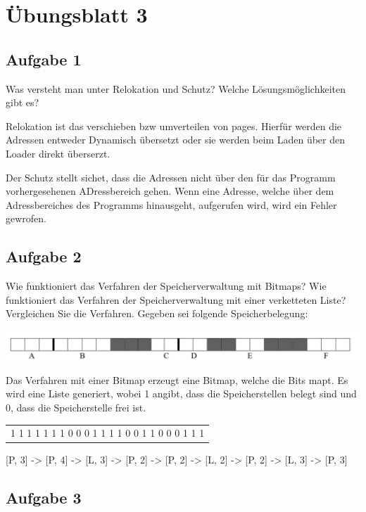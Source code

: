 \chapter{Übungsblatt 3}

\section{Aufgabe 1}

Was versteht man unter Relokation und Schutz? Welche Lösungsmöglichkeiten gibt es?

Relokation ist das verschieben bzw umverteilen von pages. Hierfür werden die Adressen entweder Dynamisch übersetzt oder sie werden beim Laden über den Loader direkt überserzt. 

Der Schutz stellt sichet, dass die Adressen nicht über den für das Programm vorhergesehenen ADressbereich gehen. Wenn eine Adresse, welche über dem Adressbereiches des Programms hinausgeht, aufgerufen wird, wird ein Fehler gewrofen.

\section{Aufgabe 2}

Wie funktioniert das Verfahren der Speicherverwaltung mit Bitmaps? Wie funktioniert das Verfahren der Speicherverwaltung mit einer verketteten Liste? Vergleichen Sie die Verfahren. Gegeben sei folgende Speicherbelegung:

\includegraphics[width=\textwidth]{assets/uebungsblatt_3_task_2.png}

Das Verfahren mit einer Bitmap erzeugt eine Bitmap, welche die Bits mapt. Es wird eine Liste generiert, wobei 1 angibt, dass die Speicherstellen belegt sind und 0, dass die Speicherstelle frei ist.

\begin{tabular}{ | c | }
  1 1 1 1 1 1 1 0 0 0 1 1 1 1 0 0 1 1 0 0 0 1 1 1
\end{tabular}

[P, 3] -> [P, 4] -> [L, 3] -> [P, 2] -> [P, 2] -> [L, 2] -> [P, 2] -> [L, 3] -> [P, 3]

\section{Aufgabe 3}

